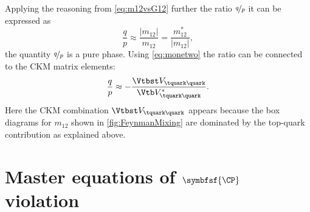 Applying the reasoning from \cref{eq:m12vsG12} further the ratio $\nicefrac{q}{p}$ it can be expressed as
\begin{equation}
\frac{q}{p}\approx\frac{\left|m_{12}\right|}{m_{12}}=\frac{m_{12}^\ast}{\left|m_{12}\right|},\label{eq:qoverPPurePhase}
\end{equation}
\ie the quantity $\nicefrac{q}{p}$ is a pure phase.
Using \cref{eq:monetwo} the ratio can be connected to the CKM matrix elements:
\begin{equation}
\frac{q}{p}\approx-\frac{\Vtbst V_{\tquark\quark}}{\Vtb V_{\tquark\quark}^\ast}.\label{eq:qoverpCKM}
\end{equation}
Here the CKM combination $\Vtbst V_{\tquark\quark}$ appears because the box diagrams for $m_{12}$ shown in \cref{fig:FeynmanMixing} are dominated by the top-quark contribution as explained above.


\section[head={Master equations of \CP violation},tocentry={Master equations of \CP violation}]{Master equations of $\symbfsf{\CP}$ violation}
\label{sec:formulaeCPV}

